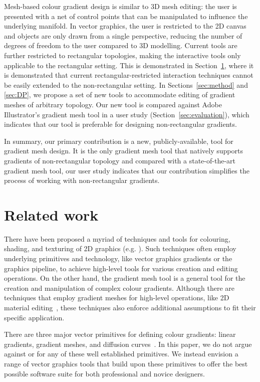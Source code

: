 \documentclass{egpubl}
\begin{document}
Mesh-based colour gradient design is similar to 3D mesh editing: the user is presented with a net of control points that can be manipulated to influence the underlying manifold. In vector graphics, the user is restricted to the 2D canvas and objects are only drawn from a single perspective, reducing the number of degrees of freedom to the user compared to 3D modelling. Current tools are further restricted to rectangular topologies, making the interactive tools only applicable to the rectangular setting. This is demonstrated in Section~\ref{sec:RW}, where it is demonstrated that current rectangular-restricted interaction techniques cannot be easily extended to the non-rectangular setting. In Sections~\ref{sec:method} and \ref{sec:DP}, we propose a set of new tools to accommodate editing of gradient meshes of arbitrary topology. Our new tool is compared against Adobe Illustrator's gradient mesh tool in a user study (Section~\ref{sec:evaluation}), which indicates that our tool is preferable for designing non-rectangular gradients.

In summary, our primary contribution is a new, publicly-available, tool for gradient mesh design. It is the only gradient mesh tool that natively supports gradients of non-rectangular topology and compared with a state-of-the-art gradient mesh tool, our user study indicates that our contribution simplifies the process of working with non-rectangular gradients.

\section{Related work}
\label{sec:RW}

There have been proposed a myriad of techniques and tools for colouring, shading, and texturing of 2D graphics (e.g. \cite{Vergne:2012, Shao:2012}). Such techniques often employ underlying primitives and technology, like vector graphics gradients or the graphics pipeline, to achieve high-level tools for various creation and editing operations. On the other hand, the gradient mesh tool is a general tool for the creation and manipulation of complex colour gradients. Although there are techniques that employ gradient meshes for high-level operations, like 2D material editing~\cite{Lopez-Moreno:2013}, these techniques also enforce additional assumptions to fit their specific application.

There are three major vector primitives for defining colour gradients: linear gradients, gradient meshes, and diffusion curves~\cite{Orzan:2008}. In this paper, we do not argue against or for any of these well established primitives. We instead envision a range of vector graphics tools that build upon these primitives to offer the best possible software suite for both professional and novice designers.
\end{document}
